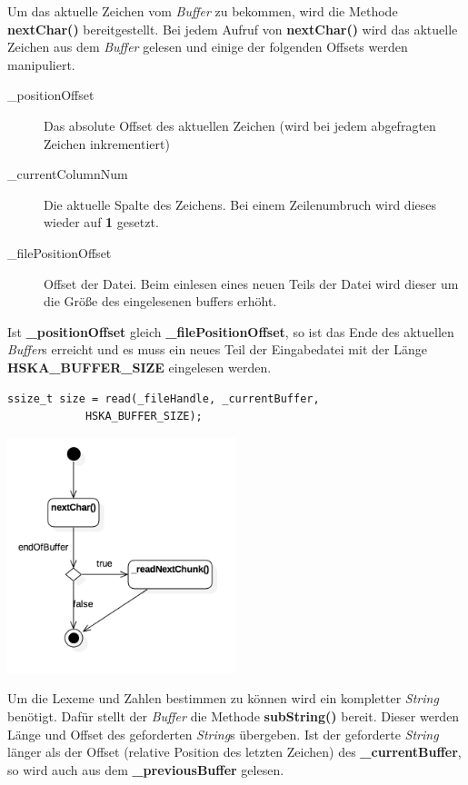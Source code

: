 \documentclass[
a4paper
]{scrreprt}
\begin{document}
	Um das aktuelle Zeichen vom \textit{Buffer} zu bekommen, wird die Methode \textbf{nextChar()} bereitgestellt. Bei jedem Aufruf von \textbf{nextChar()} wird das aktuelle Zeichen aus dem \textit{Buffer} gelesen und einige der folgenden Offsets werden manipuliert.
	\begin{description}
		\item[\_positionOffset] Das absolute Offset des aktuellen Zeichen (wird bei jedem abgefragten Zeichen inkrementiert)
		\item[\_currentColumnNum] Die aktuelle Spalte des Zeichens. Bei einem Zeilenumbruch wird dieses wieder auf \textbf{1} gesetzt.
		\item[\_filePositionOffset] Offset der Datei. Beim einlesen eines neuen Teils der Datei wird dieser um die Größe des eingelesenen buffers erhöht. 
	\end{description}
	
	Ist \textbf{\_positionOffset} gleich \textbf{\_filePositionOffset}, so ist das Ende des aktuellen \textit{Buffer}s erreicht und es muss ein neues Teil der Eingabedatei mit der Länge \textbf{HSKA\_BUFFER\_SIZE} eingelesen werden.
	\begin{lstlisting}
ssize_t size = read(_fileHandle, _currentBuffer, 
			HSKA_BUFFER_SIZE);
	\end{lstlisting}
	
	\begin{center}
		\includegraphics[width=0.5\textwidth]{./images/buffer_activity.png}
	\end{center}
	
	Um die Lexeme und Zahlen bestimmen zu können wird ein kompletter \textit{String} benötigt. Dafür stellt der \textit{Buffer} die Methode \textbf{subString()} bereit. Dieser werden Länge und Offset des geforderten \textit{String}s übergeben.
	Ist der geforderte \textit{String} länger als der Offset (relative Position des letzten Zeichen) des \textbf{\_currentBuffer}, so wird auch aus dem \textbf{\_previousBuffer} gelesen.
	
\end{document}
